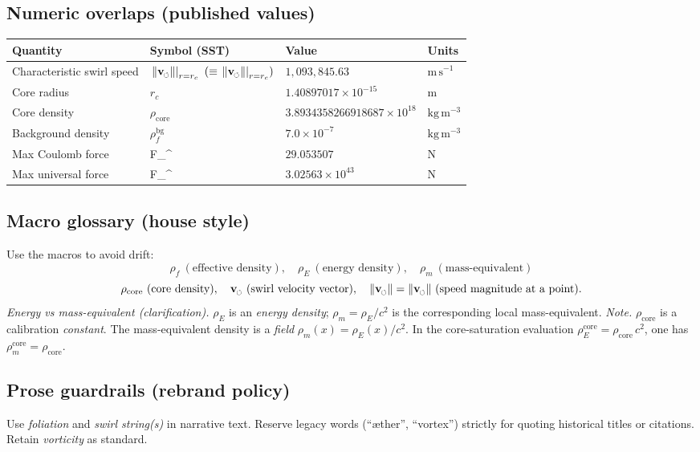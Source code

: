 \documentclass[11pt]{article}
\newcommand{\swirlarrow}{%
	\mathchoice{\mkern-2mu\scriptstyle\boldsymbol{\circlearrowleft}}%
	{\mkern-2mu\scriptstyle\boldsymbol{\circlearrowleft}}%
	{\mkern-2mu\scriptscriptstyle\boldsymbol{\circlearrowleft}}%
	{\mkern-2mu\scriptscriptstyle\boldsymbol{\circlearrowleft}}%
}
\newcommand{\vswirl}{\mathbf{v}_{\swirlarrow}}
\newcommand{\vscore}{v_s}                                %
\newcommand{\vnorm}{\lVert \vswirl \rVert}               %
\newcommand{\rhoF}{\rho_{\!f}}                           %
\newcommand{\rhoE}{\rho_{\!E}}                           %
\newcommand{\rhoM}{\rho_{\!m}}                           %
\newcommand{\rhoC}{\rho_{\mathrm{core}}} %
\newcommand{\FmaxEM}{F_{\mathrm{EM}}^{\max}}             %
\newcommand{\FmaxG}{F_{\mathrm{G}}^{\max}}               %
\providecommand{\rc}{r_c} %
\newcommand{\vcore}{\left.\vnorm\right|_{r=\rc}}        %
\renewcommand{\vscore}{\vcore}
\newcommand{\CoreSaturationNote}{%
	\textit{Note.} \(\rho_{\mathrm{core}}\) is a calibration \emph{constant}. The mass-equivalent density is a \emph{field} \(\rho_{\!m}(x)=\rho_{\!E}(x)/c^2\).
	In the core-saturation evaluation \(\rho_{\!E}^{\text{core}}=\rho_{\mathrm{core}}\,c^2\), one has \(\rho_{\!m}^{\text{core}}=\rho_{\mathrm{core}}\).}
\begin{document}
	\subsection*{Numeric overlaps (published values)}
	\begin{center}
		\begin{tabular}{llll}
			\hline
			\textbf{Quantity} & \textbf{Symbol (SST)} & \textbf{Value} & \textbf{Units} \\
			\hline
			Characteristic swirl speed & $\vscore\ (\equiv \left.\vnorm\right|_{r=\rc})$ & $1{,}093{,}845.63$ & $\mathrm{m\,s^{-1}}$ \\
			Core radius & $r_c$ & $1.40897017\times 10^{-15}$ & $\mathrm{m}$ \\
			Core density & $\rhoC$ & $3.8934358266918687\times 10^{18}$ & $\mathrm{kg\,m^{-3}}$ \\
			Background density & $\rhoF^{\mathrm{bg}}$ & $7.0\times 10^{-7}$ & $\mathrm{kg\,m^{-3}}$ \\
			Max Coulomb force & \FmaxEM & $29.053507$ & $\mathrm{N}$ \\
			Max universal force & \FmaxG & $3.02563\times 10^{43}$ & $\mathrm{N}$ \\
			\hline
		\end{tabular}
	\end{center}

	\subsection*{Macro glossary (house style)}
	Use the macros to avoid drift:
	\[
		\rhoF\ (\text{effective density}),\quad
		\rhoE\ (\text{energy density}),\quad
		\rhoM\ (\text{mass-equivalent})
	\]\[
		\rhoC\ (\text{core density}),\quad
		\vswirl\ (\text{swirl velocity vector}),\quad
		\vnorm=\lVert\vswirl\rVert\ (\text{speed magnitude at a point}) .
	\]
	\medskip
	\noindent\textit{Energy vs mass-equivalent (clarification).} \(\rhoE\) is an \emph{energy density}; \(\rhoM=\rhoE/c^2\) is the corresponding local mass-equivalent. \CoreSaturationNote

	\subsection*{Prose guardrails (rebrand policy)}
	Use \emph{foliation} and \emph{swirl string(s)} in narrative text. Reserve legacy words (``æther'', ``vortex'') strictly for quoting historical titles or citations. Retain \emph{vorticity} as standard.
\end{document}
